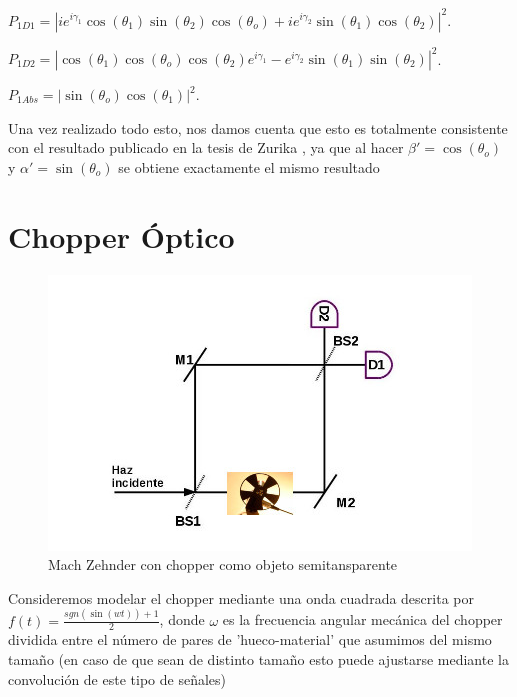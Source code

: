 \documentclass[11pt]{article}
\begin{document}
\vspace{5cm}

$P_{1D1}=|ie^{i\gamma_{1}}\cos(\theta_{1})\sin(\theta_{2})\cos(\theta_{o})+i e^{i\gamma_{2}}\sin(\theta_{1})\cos(\theta_{2})|^2$.

\vspace{0.1cm}

$P_{1D2}=|\cos(\theta_{1})\cos(\theta_{o})\cos(\theta_{2})e^{i\gamma_{1}}-e^{i\gamma_{2}} \sin(\theta_{1})\sin(\theta_{2})|^2$.

\vspace{0.1cm}

$P_{1Abs}=|\sin(\theta_{o}) \cos(\theta_{1})|^2$.

\vspace{0.3cm}

Una vez realizado todo esto, nos damos cuenta que esto es totalmente consistente con el resultado publicado en la tesis de Zurika , ya que al hacer $\beta'=\cos(\theta_{o})$ y $\alpha'=\sin(\theta_{o})$ se obtiene exactamente el mismo resultado
 


\section
{Chopper
 Óptico}
 
 \begin{figure}[h!]
\centering
\includegraphics[width=\linewidth]{machzenhderchopper.jpg}
\caption{Mach Zehnder con chopper como objeto semitansparente}
\label{fig:BS2}
\end{figure}
Consideremos modelar el chopper
 mediante una onda cuadrada descrita por $f
(t)=\frac{sgn
(\sin(wt
))+1}{2}$, donde 
$\omega$ es la frecuencia angular mecánica del chopper
 dividida entre el número de pares de 'hueco-material' que asumimos del mismo tamaño (en caso de que sean de distinto tamaño esto puede ajustarse mediante la convolución de este tipo de señales)
\end{document}
